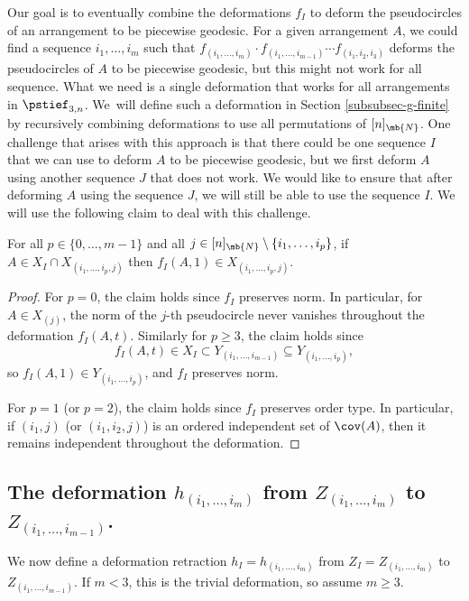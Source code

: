 Our goal is to eventually combine the deformations $f_I$ to deform the pseudocircles of an arrangement to be piecewise geodesic. For a given arrangement $A$, we could find a sequence $i_1,\dots,i_m$ such that $f_{(i_1,\dots,i_m)}\cdot f_{(i_1,\dots,i_{m-1})}\cdots f_{(i_1,i_2,i_3)}$ deforms the pseudocircles of $A$ to be piecewise geodesic, but this might not work for all sequence.
What we need is a single deformation that works for all arrangements in $\pstief_{3,n}$. We~will define such a deformation in Section \ref{subsubsec-g-finite} by recursively combining deformations to use all permutations of $[n]_\mb{N}$. One challenge that arises with this approach is that there could be one sequence $I$ that we can use to deform $A$ to be piecewise geodesic, but we first deform $A$ using another sequence $J$ that does not work. We would like to ensure that after deforming $A$ using the sequence $J$, we will still be able to use the sequence $I$. We will use the following claim to deal with this challenge.

\begin{claim}\label{claim-stable-f}
For all $p \in \{0,\dots,m{-}1\}$ and all $j \in [n]_\mb{N} \setminus \{i_1,\dots,i_p\}$,
if $A \in X_I \cap X_{(i_1,\dots,i_{p},j)}$ then $f_I(A,1) \in X_{(i_1,\dots,i_{p},j)}$.
\end{claim}

\begin{proof}
For $p=0$, the claim holds since $f_I$ preserves norm. In particular, for \hbox{$A \in X_{(j)}$}, the norm of the $j$-th pseudocircle never vanishes throughout the deformation $f_I(A,t)$.
Similarly for $p\geq 3$, the claim holds since
\[
f_I(A,t) \in X_I \subset Y_{(i_1,\dots,i_{m-1})} \subseteq Y_{(i_1,\dots,i_p)},
\]
so $f_I(A,1) \in Y_{(i_1,\dots,i_p)}$, and $f_I$ preserves norm.

For $p=1$ (or $p=2$), the claim holds since $f_I$ preserves order type. In particular, if $(i_1,j)$ (or $(i_1,i_2,j)$) is an ordered independent set of $\cov(A)$, then it remains independent throughout the deformation.
\end{proof}

\subsection{The deformation $h_{(i_1,\dots,i_m)}$ from $Z_{(i_1,\dots,i_m)}$ to $Z_{(i_1,\dots,i_{m-1})}$.}
\label{subsubsec-h}

We now define a deformation retraction $h_I = h_{(i_1,\dots,i_m)}$ from $Z_I = Z_{(i_1,\dots,i_m)}$ to $Z_{(i_1,\dots,i_{m-1})}$. If $m < 3$, this is the trivial deformation, so assume $m \geq 3$.


